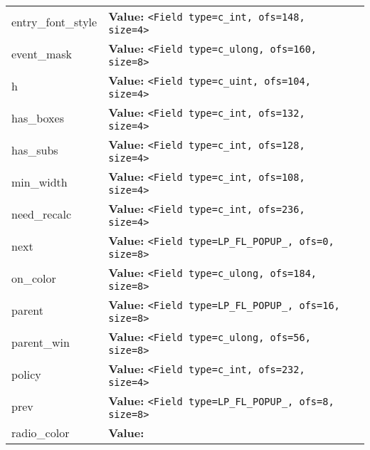 \begin{longtable}{|p{\varnamewidth}|p{\vardescrwidth}|l}
\cline{1-2}
\raggedright e\-n\-t\-r\-y\-\_\-f\-o\-n\-t\-\_\-s\-t\-y\-l\-e\- & \raggedright \textbf{Value:} 
{\tt {\textless}Field type=c\_int, ofs=148, size=4{\textgreater}}&\\
\cline{1-2}
\raggedright e\-v\-e\-n\-t\-\_\-m\-a\-s\-k\- & \raggedright \textbf{Value:} 
{\tt {\textless}Field type=c\_ulong, ofs=160, size=8{\textgreater}}&\\
\cline{1-2}
\raggedright h\- & \raggedright \textbf{Value:} 
{\tt {\textless}Field type=c\_uint, ofs=104, size=4{\textgreater}}&\\
\cline{1-2}
\raggedright h\-a\-s\-\_\-b\-o\-x\-e\-s\- & \raggedright \textbf{Value:} 
{\tt {\textless}Field type=c\_int, ofs=132, size=4{\textgreater}}&\\
\cline{1-2}
\raggedright h\-a\-s\-\_\-s\-u\-b\-s\- & \raggedright \textbf{Value:} 
{\tt {\textless}Field type=c\_int, ofs=128, size=4{\textgreater}}&\\
\cline{1-2}
\raggedright m\-i\-n\-\_\-w\-i\-d\-t\-h\- & \raggedright \textbf{Value:} 
{\tt {\textless}Field type=c\_int, ofs=108, size=4{\textgreater}}&\\
\cline{1-2}
\raggedright n\-e\-e\-d\-\_\-r\-e\-c\-a\-l\-c\- & \raggedright \textbf{Value:} 
{\tt {\textless}Field type=c\_int, ofs=236, size=4{\textgreater}}&\\
\cline{1-2}
\raggedright n\-e\-x\-t\- & \raggedright \textbf{Value:} 
{\tt {\textless}Field type=LP\_FL\_POPUP\_, ofs=0, size=8{\textgreater}}&\\
\cline{1-2}
\raggedright o\-n\-\_\-c\-o\-l\-o\-r\- & \raggedright \textbf{Value:} 
{\tt {\textless}Field type=c\_ulong, ofs=184, size=8{\textgreater}}&\\
\cline{1-2}
\raggedright p\-a\-r\-e\-n\-t\- & \raggedright \textbf{Value:} 
{\tt {\textless}Field type=LP\_FL\_POPUP\_, ofs=16, size=8{\textgreater}}&\\
\cline{1-2}
\raggedright p\-a\-r\-e\-n\-t\-\_\-w\-i\-n\- & \raggedright \textbf{Value:} 
{\tt {\textless}Field type=c\_ulong, ofs=56, size=8{\textgreater}}&\\
\cline{1-2}
\raggedright p\-o\-l\-i\-c\-y\- & \raggedright \textbf{Value:} 
{\tt {\textless}Field type=c\_int, ofs=232, size=4{\textgreater}}&\\
\cline{1-2}
\raggedright p\-r\-e\-v\- & \raggedright \textbf{Value:} 
{\tt {\textless}Field type=LP\_FL\_POPUP\_, ofs=8, size=8{\textgreater}}&\\
\cline{1-2}
\raggedright r\-a\-d\-i\-o\-\_\-c\-o\-l\-o\-r\- & \raggedright \textbf{Value:} 

\end{longtable}
